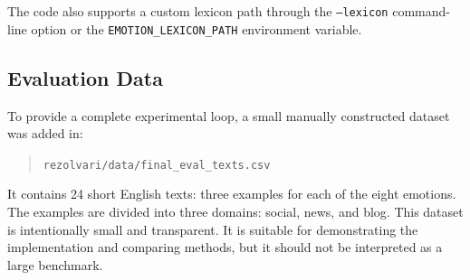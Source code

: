 The code also supports a custom lexicon path through the \texttt{--lexicon} command-line option or the \texttt{EMOTION\_LEXICON\_PATH} environment variable.

\subsection{Evaluation Data}

To provide a complete experimental loop, a small manually constructed dataset was added in:

\begin{quote}
\texttt{rezolvari/data/final\_eval\_texts.csv}
\end{quote}

It contains 24 short English texts: three examples for each of the eight emotions. The examples are divided into three domains: social, news, and blog. This dataset is intentionally small and transparent. It is suitable for demonstrating the implementation and comparing methods, but it should not be interpreted as a large benchmark.
